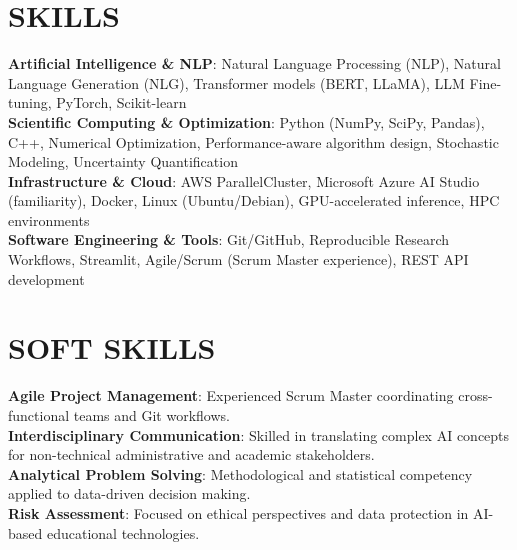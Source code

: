 \documentclass[A4,11pt]{article}
\begin{document}









\section{SKILLS}
 \begin{itemize}[leftmargin=0.15in, label={}]
    \small{\item{
     \textbf{Artificial Intelligence \& NLP}{: Natural Language Processing (NLP), Natural Language Generation (NLG), Transformer models (BERT, LLaMA), LLM Fine-tuning, PyTorch, Scikit-learn} \\
     
     \textbf{Scientific Computing \& Optimization}{: Python (NumPy, SciPy, Pandas), C++, Numerical Optimization, Performance-aware algorithm design, Stochastic Modeling, Uncertainty Quantification} \\
     
     \textbf{Infrastructure \& Cloud}{: AWS ParallelCluster, Microsoft Azure AI Studio (familiarity), Docker, Linux (Ubuntu/Debian), GPU-accelerated inference, HPC environments} \\
     
     \textbf{Software Engineering \& Tools}{: Git/GitHub, Reproducible Research Workflows, Streamlit, Agile/Scrum (Scrum Master experience), REST API development} \\
     
    }}
 \end{itemize}



\section{SOFT SKILLS}
 \begin{itemize}[leftmargin=0.15in, label={}]
    \small{\item{
     \textbf{Agile Project Management}{: Experienced Scrum Master coordinating cross-functional teams and Git workflows.} \\
     \textbf{Interdisciplinary Communication}{: Skilled in translating complex AI concepts for non-technical administrative and academic stakeholders.} \\
     \textbf{Analytical Problem Solving}{: Methodological and statistical competency applied to data-driven decision making.} \\
     \textbf{Risk Assessment}{: Focused on ethical perspectives and data protection in AI-based educational technologies.}
    }}
 \end{itemize}
\end{document}
